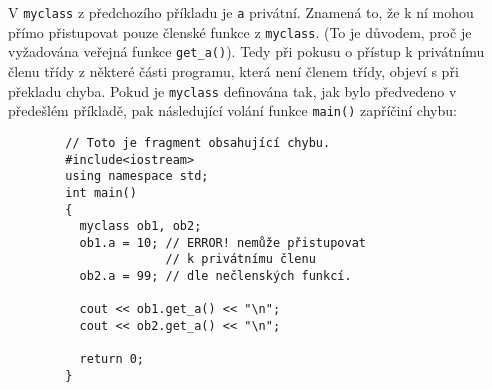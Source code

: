       \begin{example}
        V \lstinline[basicstyle=\ttfamily]!myclass! z předchozího příkladu je 
        \lstinline[basicstyle=\ttfamily]!a! privátní. Znamená to, že k ní mohou přímo přistupovat 
        pouze členské funkce z \lstinline[basicstyle=\ttfamily]!myclass!. (To je důvodem, proč je 
        vyžadována veřejná funkce \lstinline[basicstyle=\ttfamily]!get_a()!). Tedy při pokusu o 
        přístup k privátnímu členu třídy z některé části programu, která není členem třídy, objeví 
        s při překladu chyba. Pokud je \lstinline[basicstyle=\ttfamily]!myclass! definována tak, 
        jak bylo předvedeno v předešlém příkladě, pak následující volání funkce 
        \lstinline[basicstyle=\ttfamily]!main()! zapříčiní chybu:
  
        \begin{lstlisting}
        // Toto je fragment obsahující chybu.
        #include<iostream>
        using namespace std;
        int main()
        {
          myclass ob1, ob2;
          ob1.a = 10; // ERROR! nemůže přistupovat
                      // k privátnímu členu
          ob2.a = 99; // dle nečlenských funkcí.
  
          cout << ob1.get_a() << "\n";
          cout << ob2.get_a() << "\n";
  
          return 0;
        }
       \end{lstlisting}
      \end{example}
  
